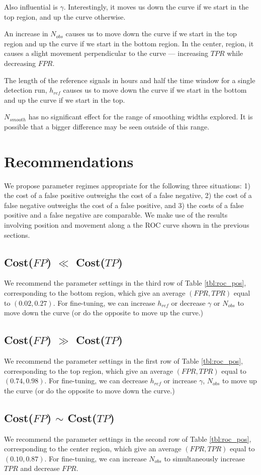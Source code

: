 Also influential is $\gamma$. Interestingly, it moves us down the curve
if we start in the top region, and up the curve otherwise. 


An increase in $N_{obs}$ causes us to move down the curve if we start in the top
region and up the curve if we start in the bottom region. In the center, region,
it causes a slight movement perpendicular to the curve --- increasing $TPR$
while decreasing $FPR$.

The length of the reference signals in hours and half the time window for a
single detection run, $h_{ref}$ causes us to move down the curve if we start in
the bottom and up the curve if we start in the top.

$N_{smooth}$ has no significant effect for the range of smoothing widths
explored. It is possible that a bigger difference may be seen outside of this
range.

\section{Recommendations}

We propose parameter regimes appropriate for the following three situations: 1)
the cost of a false positive outweighs the cost of a false negative, 2) the cost
of a false negative outweighs the cost of a false positive, and 3) the costs of
a false positive and a false negative are comparable. We make use of the results
involving position and movement along a the ROC curve shown in the previous
sections.

\subsection{Cost($FP$) $\ll$ Cost($TP$)}
We recommend the parameter settings in the third row of Table \ref{tbl:roc_pos},
corresponding to the bottom region, which give an average $(FPR,TPR)$ equal to
$(0.02,0.27)$. For fine-tuning, we can increase $h_{ref}$ or decrease $\gamma$ or
$N_{obs}$ to move down the curve (or do the opposite to move up the curve.)

\subsection{Cost($FP$) $\gg$ Cost($TP$)}
We recommend the parameter settings in the first row of Table \ref{tbl:roc_pos},
corresponding to the top region, which give an average $(FPR,TPR)$ equal to
$(0.74,0.98)$. For fine-tuning, we can decrease $h_{ref}$ or increase $\gamma$,
$N_{obs}$ to move up the curve (or do the opposite to move down the curve.)

\subsection{Cost($FP$) $\sim$ Cost($TP$)}
We recommend the parameter settings in the second row of Table
\ref{tbl:roc_pos}, corresponding to the center region, which give an average
$(FPR,TPR)$ equal to $(0.10,0.87)$. For fine-tuning, we can increase $N_{obs}$
to simultaneously increase $TPR$ and decrease $FPR$.

